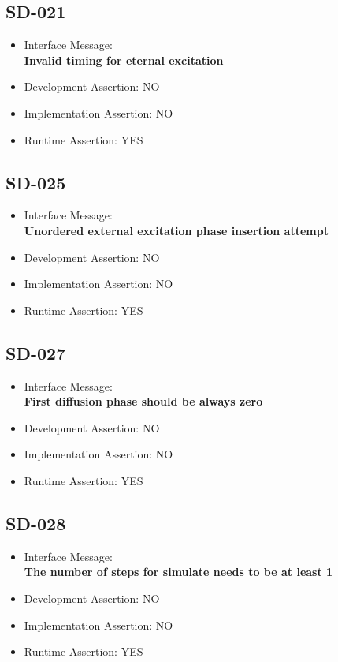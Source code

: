 \subsection{SD-021}
\begin{itemize}
  \item Interface Message:\\[1em]\textbf{Invalid timing for eternal excitation}
  \item Development Assertion: NO
  \item Implementation Assertion: NO
  \item Runtime Assertion: YES
\end{itemize}

\subsection{SD-025}
\begin{itemize}
  \item Interface Message:\\[1em]\textbf{Unordered external excitation phase insertion attempt}
  \item Development Assertion: NO
  \item Implementation Assertion: NO
  \item Runtime Assertion: YES
\end{itemize}

\subsection{SD-027}
\begin{itemize}
  \item Interface Message:\\[1em]\textbf{First diffusion phase should be always zero}
  \item Development Assertion: NO
  \item Implementation Assertion: NO
  \item Runtime Assertion: YES
\end{itemize}

\subsection{SD-028}
\begin{itemize}
  \item Interface Message:\\[1em]\textbf{The number of steps for simulate needs to be at least 1}
  \item Development Assertion: NO
  \item Implementation Assertion: NO
  \item Runtime Assertion: YES
\end{itemize}

